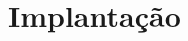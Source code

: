 \documentclass[	DIV=calc,%
							paper=a4,%
							fontsize=12pt,%
							onecolumn]{scrartcl}	 					%
\begin{document}
\section{Implantação}



\end{document}
